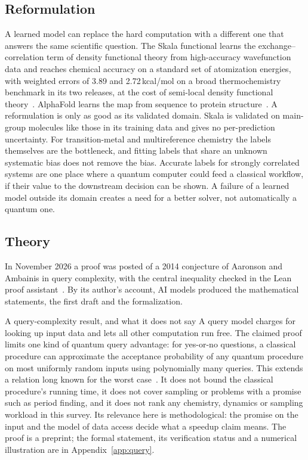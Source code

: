 \documentclass[10pt,a4paper]{article}
\begin{document}
\subsection{Reformulation}
A learned model can replace the hard computation with a different one that answers the same scientific question. The Skala functional learns the exchange--correlation term of density functional theory from high-accuracy wavefunction data and reaches chemical accuracy on a standard set of atomization energies, with weighted errors of 3.89 and 2.72\,kcal/mol on a broad thermochemistry benchmark in its two releases, at the cost of semi-local density functional theory~\cite{luise2025,skala10,skala11}. AlphaFold learns the map from sequence to protein structure~\cite{jumper2021}. A reformulation is only as good as its validated domain. Skala is validated on main-group molecules like those in its training data and gives no per-prediction uncertainty. For transition-metal and multireference chemistry the labels themselves are the bottleneck, and fitting labels that share an unknown systematic bias does not remove the bias. Accurate labels for strongly correlated systems are one place where a quantum computer could feed a classical workflow, if their value to the downstream decision can be shown. A failure of a learned model outside its domain creates a need for a better solver, not automatically a quantum one.

\subsection{Theory}
In November 2026 a proof was posted of a 2014 conjecture of Aaronson and Ambainis in query complexity, with the central inequality checked in the Lean proof assistant~\cite{aa2014,turturean2026}. By its author's account, AI models produced the mathematical statements, the first draft and the formalization.

\begin{rulebox}{A query-complexity result, and what it does not say}
A query model charges for looking up input data and lets all other computation run free. The claimed proof limits one kind of quantum query advantage: for yes-or-no questions, a classical procedure can approximate the acceptance probability of any quantum procedure on most uniformly random inputs using polynomially many queries. This extends a relation long known for the worst case~\cite{beals2001,abkrt2021}. It does not bound the classical procedure's running time, it does not cover sampling or problems with a promise such as period finding, and it does not rank any chemistry, dynamics or sampling workload in this survey. Its relevance here is methodological: the promise on the input and the model of data access decide what a speedup claim means. The proof is a preprint; the formal statement, its verification status and a numerical illustration are in Appendix~\ref{app:query}.
\end{rulebox}
\end{document}
